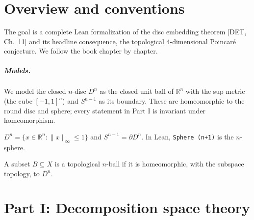 %

\chapter{Overview and conventions}

The goal is a complete Lean formalization of the disc embedding theorem
[DET, Ch.~11] and its headline consequence, the topological
4-dimensional Poincar\'e conjecture. We follow the book chapter by chapter.

\paragraph{Models.} We model the closed $n$-disc $D^n$ as the closed unit ball
of $\mathbb{R}^n$ with the sup metric (the cube $[-1,1]^n$) and $S^{n-1}$ as its
boundary. These are homeomorphic to the round disc and sphere; every statement
in Part I is invariant under homeomorphism.

\begin{definition}
  \label{def:disc}
  \leanok
  $D^n = \{x \in \mathbb{R}^n : \|x\|_\infty \le 1\}$ and
  $S^{n-1} = \partial D^n$. In Lean, \texttt{Sphere (n+1)} is the $n$-sphere.
\end{definition}

\begin{definition}
  \label{def:top-ball}
  \leanok
  A subset $B \subseteq X$ is a topological $n$-ball if it is homeomorphic,
  with the subspace topology, to $D^n$.
\end{definition}

\chapter{Part I: Decomposition space theory}

